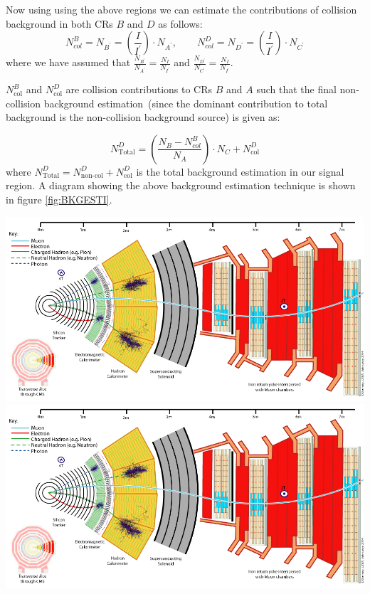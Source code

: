Now using using the above regions we can estimate the contributions of collision background in both CRs $B$ and $D$ as follows:
\begin{equation}
\displaystyle{N^{B}_{col} = N_{B^{\prime}}  = \left( \frac{I}{I^{\prime}} \right)\cdot N_{A^{\prime}}}, \quad \quad
\displaystyle{N^{D}_{col} = N_{D^{\prime}}  = \left( \frac{I}{I^{\prime}} \right)\cdot N_{C^{\prime}}}
\end{equation}
where we have assumed that $\frac{N_{B^{\prime}}}{N_{A^{\prime}}}  = \frac{N_{I}}{N_{I^{\prime}}}$ and  $\frac{N_{D^{\prime}}}{N_{C^{\prime}}}  = \frac{N_{I}}{N_{I^{\prime}}}$.
\newline

$N^{B}_{\mbox{col}}$ and $N^{D}_{\mbox{col}}$ are collision contributions to  CRs $B$ and $A$ such that the final non-collision background estimation~(since the dominant contribution to total background  is the non-collision background source) is given as:

\begin{equation}
N^{D}_{\mbox{Total}} = \left(\frac{N_{B} - N^{B}_{col} }{N_{A}} \right)\cdot N_{C} + N^{D}_{\mbox{col}} 
\end{equation}\label{eq:bkg}
where $N^{D}_{\mbox{Total}} = N^{D}_{\mbox{non-col}} + N^{D}_{\mbox{col}}$ is the total background estimation in  our signal region.
A diagram showing the above background estimation technique is shown in figure \ref{fig:BKGESTI}.
\begin{center}
\centering
\includegraphics[scale=0.2]{THESISPLOTS/CMS_Slice.png}
\includegraphics[scale=0.2]{THESISPLOTS/CMS_Slice.png}
\label{fig:BKGESTI}
\end{center}


